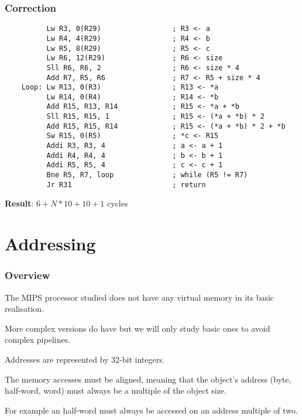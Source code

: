 \begin{frame}[containsverbatim]
  \frametitle{Correction}

  \begin{verbatim}
          Lw R3, 0(R29)                 ; R3 <- a
          Lw R4, 4(R29)                 ; R4 <- b
          Lw R5, 8(R29)                 ; R5 <- c
          Lw R6, 12(R29)                ; R6 <- size
          Sll R6, R6, 2                 ; R6 <- size * 4
          Add R7, R5, R6                ; R7 <- R5 + size * 4
    Loop: Lw R13, 0(R3)                 ; R13 <- *a
          Lw R14, 0(R4)                 ; R14 <- *b
          Add R15, R13, R14             ; R15 <- *a + *b
          Sll R15, R15, 1               ; R15 <- (*a + *b) * 2
          Add R15, R15, R14             ; R15 <- (*a + *b) * 2 + *b
          Sw R15, 0(R5)                 ; *c <- R15
          Addi R3, R3, 4                ; a <- a + 1
          Addi R4, R4, 4                ; b <- b + 1
          Addi R5, R5, 4                ; c <- c + 1
          Bne R5, R7, loop              ; while (R5 != R7)
          Jr R31                        ; return
  \end{verbatim}

  \textbf{Result}: $6 + N * 10 + 10 + 1$ cycles
\end{frame}

%
%

\section{Addressing}


\begin{frame}
  \frametitle{Overview}

  The MIPS processor studied does not have any virtual memory in its basic
  realisation.

  \-

  More complex versions do have but we will only study basic ones to
  avoid complex pipelines.

  \-

  Addresses are represented by 32-bit integers.

  \-

  The memory accesses must be aligned, meaning that the object's address
  (byte, half-word, word) must always be a multiple of the object size.

  \-

  For example an half-word must always be accessed on an address multiple
  of two.
\end{frame}

